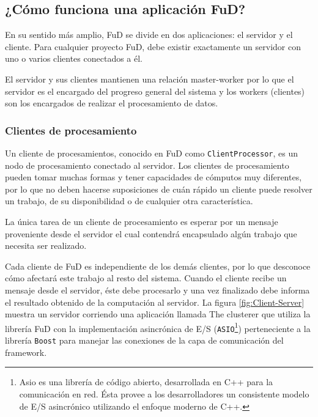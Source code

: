 \subsection{¿Cómo funciona una aplicación FuD?}

En su sentido más amplio, FuD se divide en dos aplicaciones: el servidor y el cliente. Para cualquier proyecto FuD, debe existir exactamente 
un servidor con uno o varios clientes conectados a él. 

El servidor y sus clientes mantienen una relación master-worker por lo que el servidor es 
el encargado del progreso general del sistema y los workers (clientes) son los encargados de realizar el procesamiento de datos.

\subsubsection{Clientes de procesamiento}

Un cliente de procesamientos, conocido en FuD como \texttt{ClientProcessor}, es un nodo de procesamiento conectado al servidor.
 Los clientes de procesamiento pueden tomar muchas formas y tener capacidades de cómputos muy diferentes, por lo que no deben hacerse
 suposiciones de cuán rápido un cliente puede resolver un trabajo, de su disponibilidad o de cualquier otra característica.

La única tarea de un cliente de procesamiento es esperar por un mensaje proveniente desde el servidor el cual contendrá encapsulado 
algún trabajo que necesita ser realizado. 

Cada cliente de FuD es independiente de los demás clientes, por lo que desconoce cómo afectará este trabajo al resto del sistema.
Cuando el cliente recibe un mensaje desde el servidor, éste debe procesarlo y una vez finalizado debe informa el resultado obtenido de la computación al servidor.
La figura \ref{fig:Client-Server} muestra un servidor corriendo una aplicación llamada The clusterer que utiliza la librería FuD con la implementación asincrónica de E/S (\texttt{ASIO}\footnote{Asio es una librería de código abierto, desarrollada en C++ para la comunicación en red. Ésta provee a los desarrolladores un consistente modelo de E/S asincrónico utilizando el enfoque moderno de C++.}) perteneciente a la librería \texttt{Boost} para manejar las conexiones de la capa de comunicación del framework.


